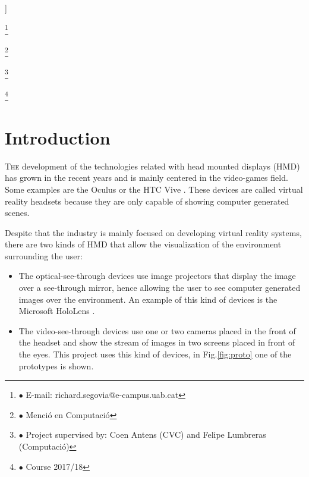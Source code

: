 \documentclass[10pt,a4paper,twocolumn,twoside]{article}
\newcommand\blfootnote[1]{%
  \begingroup
  \renewcommand\thefootnote{}\footnote{#1}%
  \addtocounter{footnote}{-1}%
  \endgroup
}
\begin{document}
\begin{@twocolumnfalse}
\begin{center}
	\bigskip
	
	{\vrule depth 0pt height 0.5pt width 4cm\hspace{7.5pt}%
	\hspace{7.5pt}\vrule depth 0pt height 0.5pt width 4cm\relax}
	
	\end{center}
	
	\bigskip
	\end{@twocolumnfalse}]
	
	\blfootnote{$\bullet$ E-mail: richard.segovia@e-campus.uab.cat}
	\blfootnote{$\bullet$ Menció en Computació}
	\blfootnote{$\bullet$ Project supervised by: Coen Antens (CVC) and Felipe Lumbreras (Computació)}
	\blfootnote{$\bullet$ Course 2017/18}
	
	\section{Introduction}
	
	\lettrine[lines=3]{T}{he} development of the technologies related with head mounted displays (HMD) has grown in the recent years and is mainly centered in the video-games field. Some examples are the Oculus \cite{web:oculus} or the HTC Vive \cite{web:vive}. These devices are called virtual reality headsets because they are only capable of showing computer generated scenes.  
	
	Despite that the industry is mainly focused on developing virtual reality systems, there are two kinds of HMD that allow the visualization of the environment surrounding the user:  

	\begin{itemize}
	\item The optical-see-through devices use image projectors that display the image over a see-through mirror, hence allowing the user to see computer generated images over the environment. An example of this kind of devices is the Microsoft HoloLens \cite{web:hololens}.
	\item The video-see-through devices use one or two cameras placed in the front of the headset and show the stream of images in two screens placed in front of the eyes. This project uses this kind of devices, in Fig.\ref{fig:proto} one of the prototypes is shown. 
	\end{itemize}
\end{document}
